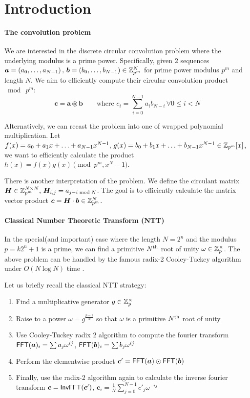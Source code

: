 \section{Introduction}
\paragraph{The convolution problem}
We are interested in the discrete circular convolution problem where the underlying modulus is a prime power. Specifically, given 2 sequences \(\bm{a} = \left({a}_0, \ldots, {a}_{N - 1}\right) ,\, \bm{b} = \left({b}_0, \ldots, {b}_{N - 1}\right) \in \mathbb{Z}_{p^m}^N\) for prime power modulus \(p^m\) and length \(N\). We aim to efficiently compute their circular convolution product \(\bmod \  p^m\):
\[\bm{c} = \bm{a} \circledast \bm{b} \qquad \text{where } c_i = \sum_{i=0}^{N-1}a_i b_{N-i} \, \forall 0 \le i < N\]

\ifFullVersion
Alternatively, we can recast the problem into one of wrapped polynomial multiplication. Let \(f(x) = a_0 + a_1 x + \ldots + a_{N-1}x^{N-1},\, g(x) = b_0 + b_1 x + \ldots + b_{N-1}x^{N-1} \in \mathbb{Z}_{p^m}[x]\), we want to efficiently calculate the product \(h(x) = f(x)g(x) \pmod{p^m, x^N - 1}\).

There is another interpretation of the problem. We define the circulant matrix \(\bm{H} \in \mathbb{Z}_{p^m}^{N \times N},\, \bm{H}_{i,j} = a_{j - i \bmod N}\). The goal is to efficiently calculate the matrix vector product \(\bm{c} = \bm{H} \cdot \bm{b} \in \mathbb{Z}_{p^m}^N\).
\fi

\paragraph{Classical Number Theoretic Transform (NTT)}
In the special(and important) case where the length \(N = 2^n\) and the modulus \(p = k2^n + 1\) is a prime, we can find a primitive \(N\textsuperscript{th}\) root of unity \(\omega \in \mathbb{Z}_p^{\times}\). The above problem can be handled by the famous radix-2 Cooley-Tuckey algorithm under \(O(N \log N)\) time . 

\ifFullVersion
Let us briefly recall the classical NTT strategy:
\begin{enumerate}
    \item Find a multiplicative generator \(g \in \mathbb{Z}_p^{\times}\)
    \item Raise to a power \(\omega = g^{\frac{p-1}{N}}\) so that \(\omega\) is a primitive \(N\textsuperscript{th}\) root of unity
    \item Use Cooley-Tuckey radix 2 algorithm to compute the fourier transform \(\mathsf{FFT}(\bm{a})_i = \sum a_j \omega^{ij}\), \(\mathsf{FFT}(\bm{b})_i = \sum b_j \omega^{ij}\)
    \item Perform the elementwise product \(\bm{c}' = \mathsf{FFT}(\bm{a}) \odot \mathsf{FFT}(\bm{b})\)
    \item Finally, use the radix-2 algorithm again to calculate the inverse fourier transform \(\bm{c} = \mathsf{InvFFT}(\bm{c}')\), \(\bm{c}_i = \frac{1}{N}\sum_{j=0}^{N-1}c'_j \omega^{-ij}\)
\end{enumerate}
\fi

